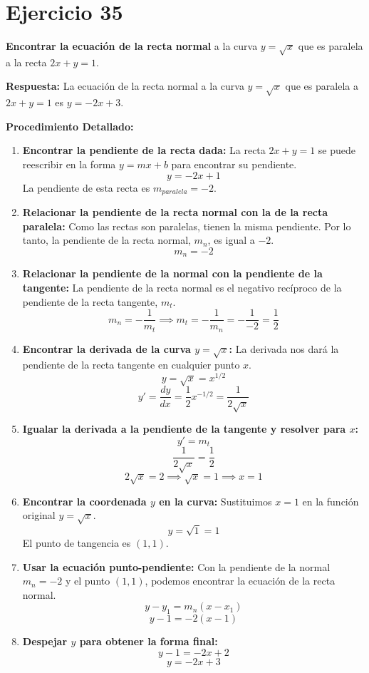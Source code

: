 \documentclass[12pt, a4paper]{article}
\begin{document}
\section{Ejercicio 35}
\textbf{Encontrar la ecuación de la recta normal} a la curva $y=\sqrt{x}$ que es paralela a la recta $2x+y=1$.

\textbf{Respuesta:}
La ecuación de la recta normal a la curva $y=\sqrt{x}$ que es paralela a $2x+y=1$ es $y=-2x+3$.

\textbf{Procedimiento Detallado:}
\begin{enumerate}
    \item \textbf{Encontrar la pendiente de la recta dada:} La recta $2x+y=1$ se puede reescribir en la forma $y=mx+b$ para encontrar su pendiente.
    \[y=-2x+1\]
    La pendiente de esta recta es $m_{paralela}=-2$.
    \item \textbf{Relacionar la pendiente de la recta normal con la de la recta paralela:} Como las rectas son paralelas, tienen la misma pendiente. Por lo tanto, la pendiente de la recta normal, $m_n$, es igual a $-2$.
    \[m_n=-2\]
    \item \textbf{Relacionar la pendiente de la normal con la pendiente de la tangente:} La pendiente de la recta normal es el negativo recíproco de la pendiente de la recta tangente, $m_t$.
    \[m_n=-\frac{1}{m_t}\implies m_t=-\frac{1}{m_n}=-\frac{1}{-2}=\frac{1}{2}\]
    \item \textbf{Encontrar la derivada de la curva $y=\sqrt{x}$:} La derivada nos dará la pendiente de la recta tangente en cualquier punto $x$.
    \[y=\sqrt{x}=x^{1/2}\]
    \[y'=\frac{dy}{dx}=\frac{1}{2}x^{-1/2}=\frac{1}{2\sqrt{x}}\]
    \item \textbf{Igualar la derivada a la pendiente de la tangente y resolver para $x$:}
    \[y'=m_t\]
    \[\frac{1}{2\sqrt{x}}=\frac{1}{2}\]
    \[2\sqrt{x}=2\implies \sqrt{x}=1\implies x=1\]
    \item \textbf{Encontrar la coordenada $y$ en la curva:} Sustituimos $x=1$ en la función original $y=\sqrt{x}$.
    \[y=\sqrt{1}=1\]
    El punto de tangencia es $(1,1)$.
    \item \textbf{Usar la ecuación punto-pendiente:} Con la pendiente de la normal $m_n=-2$ y el punto $(1,1)$, podemos encontrar la ecuación de la recta normal.
    \[y-y_1=m_n(x-x_1)\]
    \[y-1=-2(x-1)\]
    \item \textbf{Despejar $y$ para obtener la forma final:}
    \[y-1=-2x+2\]
    \[y=-2x+3\]
\end{enumerate}
\end{document}

